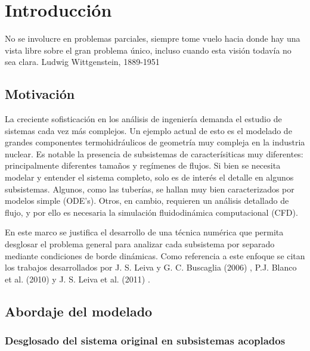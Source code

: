 \chapter{Introducción}
\label{chap1}
\chapterquote
{No se involucre en problemas parciales,
siempre tome vuelo hacia donde hay una vista libre sobre el gran problema único,
incluso cuando esta visión todavía no sea clara.}
{Ludwig Wittgenstein, 1889-1951}

\section{Motivación}
\label{1:motivacion}

La creciente sofisticación en los análisis de ingeniería demanda el estudio de sistemas cada vez más complejos.
Un ejemplo actual de esto es el modelado de grandes componentes termohidráulicos de geometría muy compleja en la industria nuclear. 
Es notable la presencia de subsistemas de caracterísiticas muy diferentes: principalmente diferentes tamaños y regímenes de flujos. 
Si bien se necesita modelar y entender el sistema completo, solo es de interés el detalle en algunos subsistemas. 
Algunos, como las tuberías, se hallan muy bien caracterizados por modelos simple (ODE's).
Otros, en cambio, requieren un análisis detallado de flujo, y por ello es necesaria la simulación fluidodinámica computacional (CFD).

En este marco se justifica el desarrollo de una técnica numérica que permita desglosar el problema general 
para analizar cada subsistema por separado mediante condiciones de borde dinámicas.
Como referencia a este enfoque se citan los trabajos desarrollados por J. S. Leiva y G. C. Buscaglia (2006) \cite{coup-0d3d}, P.J. Blanco et al. (2010) \cite{coup-black} y J. S. Leiva et al. (2011) \cite{coup-hyd}.

\section{Abordaje del modelado}
\label{1:abordaje}

\subsection{Desglosado del sistema original en subsistemas acoplados}
\label{1:acoplamiento}

